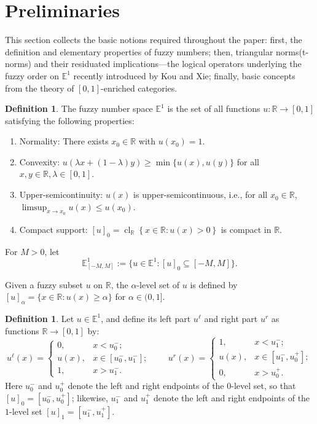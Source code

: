 \documentclass[preprint,3p,times]{elsarticle}
\theoremstyle{plain}
\theoremstyle{definition}
\newtheorem{definition}[thm]{Definition}
\numberwithin{equation}{section}
\begin{document}
\section{Preliminaries} 
  This section collects the basic notions required throughout the paper: first,
 the definition and elementary properties of fuzzy numbers; then, triangular norms(t-norms) and their residuated implications—the logical operators underlying the fuzzy order on \(\mathbb{E}^1\) recently introduced by Kou and Xie; finally, basic concepts from the theory of \([0,1]\)-enriched categories.
\begin{definition}
The fuzzy number space \( \mathbb{E}^1 \) is the set of all functions \( u :\mathbb{R}\to [0,1]\) satisfying the following properties:
\begin{enumerate}[label={\textup{(\arabic*)}}]
  \item Normality: There exists \( x_0 \in \mathbb{R} \) with \( u(x_0) = 1 \).
  \item Convexity: \( u(\lambda x + (1-\lambda)y) \geq \min \{u(x), u(y)\} \) for all \( x, y \in \mathbb{R}, \lambda \in [0, 1] \).
  \item Upper-semicontinuity: \( u(x) \) is upper-semicontinuous, i.e., for all  \(x_0\in \mathbb{R}\), \(
\limsup_{x \to x_0} u(x) \le u(x_0).\) 
  \item Compact support: \([u]_0=\operatorname{cl}_{\mathbb{R}} \left\{x \in \mathbb{R} : u(x) > 0\right\} \) is compact in \( \mathbb{R} \).
\end{enumerate}
For \(M>0\), let
\[
\mathbb{E}^1_{[-M,M]}
 :=\{u\in\mathbb{E}^1:[u]_0\subseteq[-M,M]\}.
\]
\end{definition} 
Given a fuzzy subset \( u \) on \( \mathbb{R} \), the \( \alpha \)-level set of \( u \) is defined by \([u]_ \alpha  = \{x \in \mathbb{R} : u(x) \geq  \alpha \} \) for \(  \alpha  \in (0, 1] \). 
\begin{definition}
    Let $u\in \mathbb{E}^1$, and define its left part \( u^\ell \) and right part \( u^r \) as functions  \( \mathbb{R} \to [0,1] \) by:
\[
u^\ell(x) =
\begin{cases}
	0, & x < u_0^-; \\
	u(x), & x \in [u_0^-, u_1^-]; \\
	1, & x > u_1^-.
\end{cases}
\qquad
u^r(x) =
\begin{cases}
	1, & x < u_1^-; \\
	u(x), & x \in [u_1^-, u_0^+]; \\
	0, & x > u_0^+.
\end{cases}
\]
Here \(u^-_0\) and \(u^+_0\) denote the left and right endpoints of the \(0\)-level set, so that \([u]_0=[u^-_0,u^+_0]\); likewise, \(u^-_1\) and \(u^+_1\) denote the left and right endpoints of the \(1\)-level set \([u]_1=[u^-_1,u^+_1]\).
\end{definition}
\end{document}
